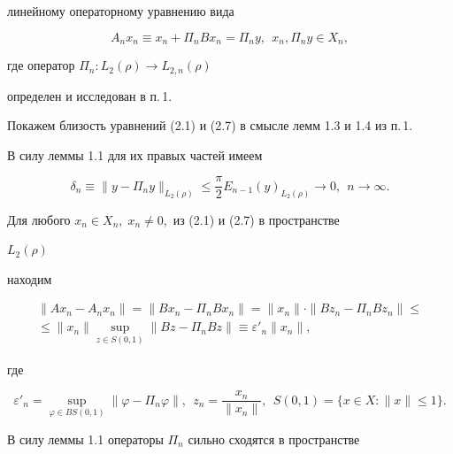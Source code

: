линейному операторному уравнению вида


\begin{equation}


A_nx_n\equiv x_n+\Pi_nBx_n=\Pi_ny,\ \ x_n,\Pi_ny\in X_n,


\end{equation}


где оператор $\Pi_n:L_2(\rho)\to L_{2,n}(\rho)$ 


определен и исследован в п.\,1.





Покажем близость уравнений (2.1) и (2.7) в смысле лемм 1.3 и 1.4 из п.\,1.


В силу леммы 1.1 для их правых частей имеем


\begin{equation}


\delta_n\equiv \|y-\Pi_ny\|_{L_2(\rho)}\le


\frac{\pi}{2}E_{n-1}(y)_{L_2(\rho)}\to 0,\ \ n\to \infty.


\end{equation}


Для любого $x_n\in X_n,\; x_n\ne 0,$ из (2.1) и (2.7) в пространстве


$L_2(\rho)$


находим


\begin{multline}


\|Ax_n-A_nx_n\|=\|Bx_n-\Pi_nBx_n\|=\|x_n\|\cdot\|Bz_n-\Pi_nBz_n\|\le \\


%


\le \|x_n\|\sup_{z\in S(0,1)}


\|Bz-\Pi_nBz\|\equiv \varepsilon'_n\|x_n\|,


\end{multline}


где


\begin{equation}


\varepsilon'_n=\sup_{\varphi\in BS(0,1)}\|\varphi-\Pi_n\varphi\|,\ \


z_n = \frac{x_n}{\|x_n\|},\ \ S(0,1)=\{x\in X:\|x\|\le 1\}.


\end{equation}





В силу леммы 1.1 операторы $\Pi_n$ сильно сходятся в пространстве


